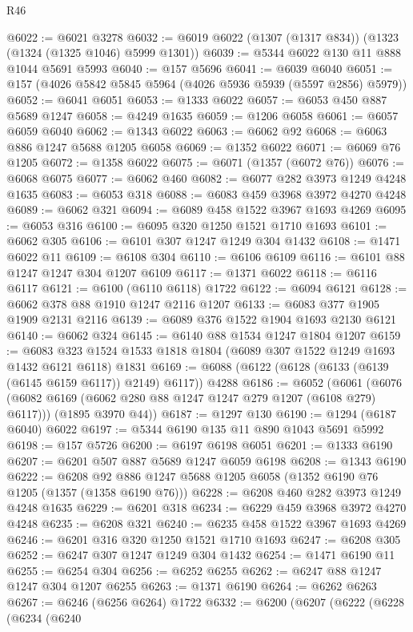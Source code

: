 \begin{lexlean}{R46}
\begin{coremodule}
@6022 := @6021 @3278
@6032 := @6019 @6022 (@1307 (@1317 @834)) (@1323 (@1324 (@1325 @1046) @5999 @1301))
@6039 := @5344 @6022 @130 @11 @888 @1044 @5691 @5993
@6040 := @157 @5696
@6041 := @6039 @6040
@6051 := @157 (@4026 @5842 @5845 @5964 (@4026 @5936 @5939 (@5597 @2856) @5979))
@6052 := @6041 @6051
@6053 := @1333 @6022
@6057 := @6053 @450 @887 @5689 @1247
@6058 := @4249 @1635
@6059 := @1206 @6058
@6061 := @6057 @6059 @6040
@6062 := @1343 @6022
@6063 := @6062 @92
@6068 := @6063 @886 @1247 @5688 @1205 @6058
@6069 := @1352 @6022
@6071 := @6069 @76 @1205
@6072 := @1358 @6022
@6075 := @6071 (@1357 (@6072 @76))
@6076 := @6068 @6075
@6077 := @6062 @460
@6082 := @6077 @282 @3973 @1249 @4248 @1635
@6083 := @6053 @318
@6088 := @6083 @459 @3968 @3972 @4270 @4248
@6089 := @6062 @321
@6094 := @6089 @458 @1522 @3967 @1693 @4269
@6095 := @6053 @316
@6100 := @6095 @320 @1250 @1521 @1710 @1693
@6101 := @6062 @305
@6106 := @6101 @307 @1247 @1249 @304 @1432
@6108 := @1471 @6022 @11
@6109 := @6108 @304
@6110 := @6106 @6109
@6116 := @6101 @88 @1247 @1247 @304 @1207 @6109
@6117 := @1371 @6022
@6118 := @6116 @6117
@6121 := @6100 (@6110 @6118) @1722
@6122 := @6094 @6121
@6128 := @6062 @378 @88 @1910 @1247 @2116 @1207
@6133 := @6083 @377 @1905 @1909 @2131 @2116
@6139 := @6089 @376 @1522 @1904 @1693 @2130 @6121
@6140 := @6062 @324
@6145 := @6140 @88 @1534 @1247 @1804 @1207
@6159 := @6083 @323 @1524 @1533 @1818 @1804 (@6089 @307 @1522 @1249 @1693 @1432 @6121 @6118) @1831
@6169 := @6088 (@6122 (@6128 (@6133 (@6139 (@6145 @6159 @6117)) @2149) @6117)) @4288
@6186 := @6052
    (@6061
      (@6076 (@6082 @6169 (@6062 @280 @88 @1247 @1247 @279 @1207 (@6108 @279) @6117)))
      (@1895 @3970 @44))
@6187 := @1297 @130
@6190 := @1294 (@6187 @6040) @6022
@6197 := @5344 @6190 @135 @11 @890 @1043 @5691 @5992
@6198 := @157 @5726
@6200 := @6197 @6198 @6051
@6201 := @1333 @6190
@6207 := @6201 @507 @887 @5689 @1247 @6059 @6198
@6208 := @1343 @6190
@6222 := @6208 @92 @886 @1247 @5688 @1205 @6058 (@1352 @6190 @76 @1205 (@1357 (@1358 @6190 @76)))
@6228 := @6208 @460 @282 @3973 @1249 @4248 @1635
@6229 := @6201 @318
@6234 := @6229 @459 @3968 @3972 @4270 @4248
@6235 := @6208 @321
@6240 := @6235 @458 @1522 @3967 @1693 @4269
@6246 := @6201 @316 @320 @1250 @1521 @1710 @1693
@6247 := @6208 @305
@6252 := @6247 @307 @1247 @1249 @304 @1432
@6254 := @1471 @6190 @11
@6255 := @6254 @304
@6256 := @6252 @6255
@6262 := @6247 @88 @1247 @1247 @304 @1207 @6255
@6263 := @1371 @6190
@6264 := @6262 @6263
@6267 := @6246 (@6256 @6264) @1722
@6332 := @6200
    (@6207
      (@6222
        (@6228
          (@6234
            (@6240

\end{coremodule}
\end{lexlean}
